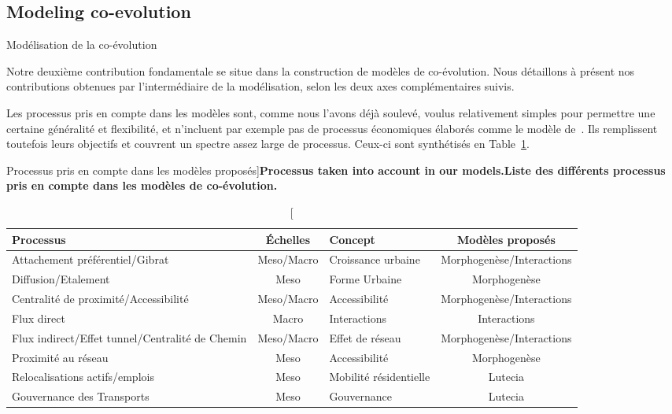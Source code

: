


\subsection{Modeling co-evolution}{Modélisation de la co-évolution}


Notre deuxième contribution fondamentale se situe dans la construction de modèles de co-évolution. Nous détaillons à présent nos contributions obtenues par l'intermédiaire de la modélisation, selon les deux axes complémentaires suivis.


Les processus pris en compte dans les modèles sont, comme nous l'avons déjà soulevé, voulus relativement simples pour permettre une certaine généralité et flexibilité, et n'incluent par exemple pas de processus économiques élaborés comme le modèle de~\cite{levinson2007co}. Ils remplissent toutefois leurs objectifs et couvrent un spectre assez large de processus. Ceux-ci sont synthétisés en Table~\ref{tab:contributions:modeled}. 


\begin{table}
\caption[Processus taken into account in our models][Processus pris en compte dans les modèles proposés]{\textbf{Processus taken into account in our models.}\label{tab:contributions:modeled}}{\textbf{Liste des différents processus pris en compte dans les modèles de co-évolution.}\label{tab:contributions:modeled}}
\begin{tabular}[6pt]{|p{4cm}|c|p{4cm}|c|}
\hline
Processus & Échelles & Concept & Modèles proposés\\\hline
Attachement préférentiel/Gibrat  & Meso/Macro & Croissance urbaine & Morphogenèse/Interactions \\\hline
Diffusion/Etalement & Meso & Forme Urbaine & Morphogenèse \\\hline
Centralité de proximité/Accessibilité & Meso/Macro & Accessibilité & Morphogenèse/Interactions \\\hline
Flux direct & Macro & Interactions & Interactions\\\hline
Flux indirect/Effet tunnel/Centralité de Chemin & Meso/Macro & Effet de réseau & Morphogenèse/Interactions \\\hline
Proximité au réseau & Meso & Accessibilité & Morphogenèse \\\hline
Relocalisations actifs/emplois & Meso & Mobilité résidentielle & Lutecia\\\hline
Gouvernance des Transports & Meso & Gouvernance & Lutecia\\\hline
\end{tabular}
\end{table}



